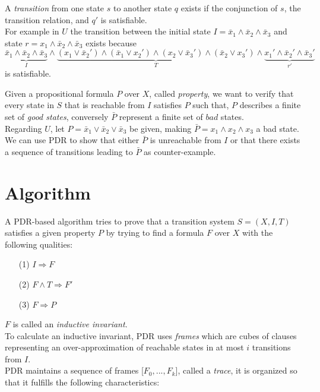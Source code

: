 \documentclass[11pt, a4paper, BCOR=10mm, ngerman]{scrbook}
\begin{document}
A \textsl{transition} from one state $s$ to another state $q$ exists if the conjunction of $s$, the transition relation, and $q'$ is satisfiable.\\ For example in $U$ the transition between the initial state $I = \bar x_1 \land \bar x_2 \land \bar x_3$ and state $r = x_1 \land \bar x_2 \land \bar x_3$ exists because
\begin{equation*}
\underbrace{\bar x_1 \land \bar x_2 \land \bar x_3}_{I} \land \underbrace{(x_1 \lor \bar x_2' ) \land ( \bar x_1 \lor x_2') \land (x_2 \lor \bar x_3') \land ( \bar x_2 \lor x_3')}_T \land \underbrace{x_1' \land \bar x_2' \land \bar x_3'}_{r'}
\end{equation*}
is satisfiable.\par

Given a propositional formula $P$ over $X$, called \textsl{property}, we want
to verify that every state in $S$ that is reachable from
$I$ satisfies $P$ such that, $P$ describes a finite set of \textsl{good states}, conversely $\bar P$ represent a finite set of $bad$ states.  \\ 
Regarding $U$, let $P = \bar x_1 \lor \bar x_2 \lor \bar x_3$ be given, making $\bar P = x_1 \land x_2 \land x_3$ a bad state. \\ 
We can use PDR to show that either $\bar P$ is unreachable from $I$ or that there exists a sequence of transitions leading to $\bar P$ as counter-example.

\section{Algorithm}
A PDR-based algorithm tries to prove that a transition system $S = (X, I, T)$ satisfies a given property $P$ by trying to find a formula $F$ over $X$ with the following qualities:
\begin{itemize}
\item[(1)] $I \Rightarrow F$
\item[(2)] $F \land T \Rightarrow F'$
\item[(3)] $F \Rightarrow P$
\end{itemize}
$F$ is called an \textsl{inductive invariant}. \\ 
To calculate an inductive invariant, PDR uses \textsl{frames} which are cubes of clauses representing an over-approximation of reachable states in at most $i$ transitions from $I$. \\
PDR maintains a sequence of frames [$F_0, ..., F_k$], called a \textsl{trace}, it is organized so that it fulfills the following characteristics: 
\end{document}
